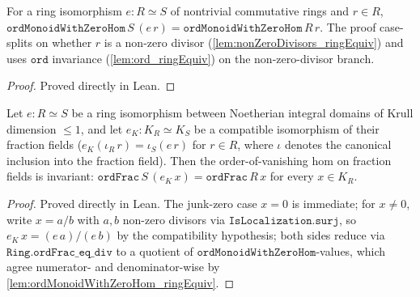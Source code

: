 \begin{lemma}

  \label{lem:ordMonoidWithZeroHom_ringEquiv}
  For a ring isomorphism \(e \colon R \simeq S\) of nontrivial commutative
  rings and \(r \in R\),
  \(\texttt{ordMonoidWithZeroHom}\,S\,(e\,r)
   = \texttt{ordMonoidWithZeroHom}\,R\,r\). The proof case-splits on whether
  \(r\) is a non-zero divisor (\ref{lem:nonZeroDivisors_ringEquiv}) and uses
  \(\texttt{ord}\) invariance (\ref{lem:ord_ringEquiv}) on the non-zero-divisor
  branch.
\end{lemma}
\begin{proof}
  Proved directly in Lean.
\end{proof}
\begin{lemma}

  \label{lem:ordFrac_ringEquiv}
  Let \(e \colon R \simeq S\) be a ring isomorphism between Noetherian
  integral domains of Krull dimension \(\leq 1\), and let
  \(e_K \colon K_R \simeq K_S\) be a compatible isomorphism of their fraction
  fields (\(e_K(\iota_R\,r) = \iota_S(e\,r)\) for \(r \in R\), where
  \(\iota\) denotes the canonical inclusion into the fraction field). Then the
  order-of-vanishing hom on fraction fields is invariant:
  \(\texttt{ordFrac}\,S\,(e_K\,x) = \texttt{ordFrac}\,R\,x\) for every
  \(x \in K_R\).
\end{lemma}
\begin{proof}
  Proved directly in Lean. The junk-zero case \(x = 0\) is immediate; for
  \(x \neq 0\), write \(x = a/b\) with \(a, b\) non-zero divisors via
  \(\texttt{IsLocalization.surj}\), so \(e_K\,x = (e\,a)/(e\,b)\) by the
  compatibility hypothesis; both sides reduce via
  \(\texttt{Ring.ordFrac\_eq\_div}\) to a quotient of
  \(\texttt{ordMonoidWithZeroHom}\)-values, which agree numerator- and
  denominator-wise by \ref{lem:ordMonoidWithZeroHom_ringEquiv}.
\end{proof}
